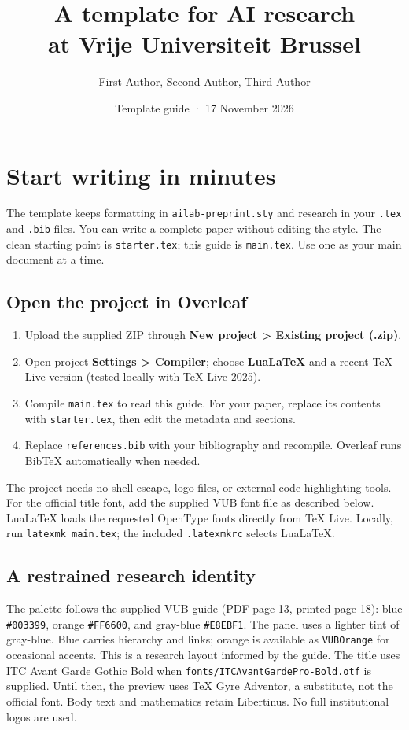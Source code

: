 \documentclass[11pt]{article}
\title{A template for AI research\\at Vrije Universiteit Brussel}
\author{First Author\affil{1}, Second Author\affil{1,2}, Third Author\affil{2}}
\affil{2}Collaborating institution, City, Country}
\date{Template guide · 17 November 2026}
\begin{document}
\maketitle

\section{Start writing in minutes}
The template keeps formatting in \texttt{ailab-preprint.sty} and research in your
\texttt{.tex} and \texttt{.bib} files. You can write a complete paper without editing
the style. The clean starting point is \texttt{starter.tex}; this guide is
\texttt{main.tex}. Use one as your main document at a time.

\subsection{Open the project in Overleaf}
\begin{enumerate}
  \item Upload the supplied ZIP through \textbf{New project > Existing project (.zip)}.
  \item Open project \textbf{Settings > Compiler}; choose \textbf{LuaLaTeX} and a
        recent TeX Live version (tested locally with TeX Live 2025).
  \item Compile \texttt{main.tex} to read this guide. For your paper, replace its
        contents with \texttt{starter.tex}, then edit the metadata and sections.
  \item Replace \texttt{references.bib} with your bibliography and recompile.
        Overleaf runs BibTeX automatically when needed.
\end{enumerate}
The project needs no shell escape, logo files, or external code highlighting tools.
For the official title font, add the supplied VUB font file as described below. LuaLaTeX loads the requested OpenType fonts directly from TeX Live. Locally, run \texttt{latexmk main.tex}; the included
\texttt{.latexmkrc} selects LuaLaTeX.

\subsection{A restrained research identity}
The palette follows the supplied VUB guide (PDF page 13, printed page 18): blue
\texttt{\#003399}, orange \texttt{\#FF6600}, and gray-blue \texttt{\#E8EBF1}.
The panel uses a lighter tint of gray-blue. Blue carries hierarchy and links;
orange is available as \texttt{VUBOrange} for occasional accents. This is a
research layout informed by the guide. The title uses ITC Avant Garde Gothic Bold
when \texttt{fonts/ITCAvantGardePro-Bold.otf} is supplied. Until then, the preview
uses TeX Gyre Adventor, a substitute, not the official font. Body text and mathematics
retain Libertinus. No full institutional logos are used.
\end{document}
